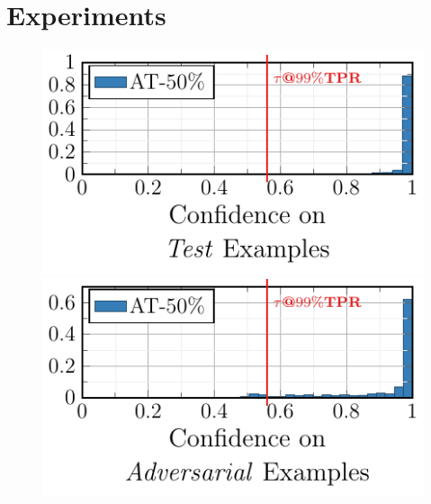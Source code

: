 \section{Experiments}
\label{sec:experiments}

\begin{figure}[t]
    \vspace*{-2px}
    \centering
    
    \begin{minipage}[t]{0.225\textwidth}
        \vspace*{0px}
        
        \centering
        \includegraphics[width=1\textwidth]{fig_msvhn_corr_advtrain}
        \vspace*{-14px}
        
        \includegraphics[width=1\textwidth]{fig_msvhn_succ_advtrain}
    \end{minipage}
    \begin{minipage}[t]{0.225\textwidth}
        \vspace*{0px}
        

\end{minipage}
\end{figure}

